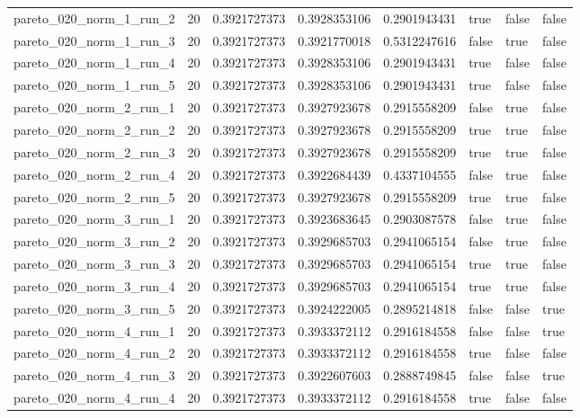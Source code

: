 \begin{tabular}{@{}llllllll@{}}
pareto\_020\_norm\_1\_run\_2 & 20 & 0.3921727373 & 0.3928353106 & 0.2901943431 & true & false & false \\
pareto\_020\_norm\_1\_run\_3 & 20 & 0.3921727373 & 0.3921770018 & 0.5312247616 & false & true & false \\
pareto\_020\_norm\_1\_run\_4 & 20 & 0.3921727373 & 0.3928353106 & 0.2901943431 & true & false & false \\
pareto\_020\_norm\_1\_run\_5 & 20 & 0.3921727373 & 0.3928353106 & 0.2901943431 & true & false & false \\
pareto\_020\_norm\_2\_run\_1 & 20 & 0.3921727373 & 0.3927923678 & 0.2915558209 & false & true & false \\
pareto\_020\_norm\_2\_run\_2 & 20 & 0.3921727373 & 0.3927923678 & 0.2915558209 & true & true & false \\
pareto\_020\_norm\_2\_run\_3 & 20 & 0.3921727373 & 0.3927923678 & 0.2915558209 & true & true & false \\
pareto\_020\_norm\_2\_run\_4 & 20 & 0.3921727373 & 0.3922684439 & 0.4337104555 & false & true & false \\
pareto\_020\_norm\_2\_run\_5 & 20 & 0.3921727373 & 0.3927923678 & 0.2915558209 & true & true & false \\
pareto\_020\_norm\_3\_run\_1 & 20 & 0.3921727373 & 0.3923683645 & 0.2903087578 & false & true & false \\
pareto\_020\_norm\_3\_run\_2 & 20 & 0.3921727373 & 0.3929685703 & 0.2941065154 & false & true & false \\
pareto\_020\_norm\_3\_run\_3 & 20 & 0.3921727373 & 0.3929685703 & 0.2941065154 & true & true & false \\
pareto\_020\_norm\_3\_run\_4 & 20 & 0.3921727373 & 0.3929685703 & 0.2941065154 & true & true & false \\
pareto\_020\_norm\_3\_run\_5 & 20 & 0.3921727373 & 0.3924222005 & 0.2895214818 & false & false & true \\
pareto\_020\_norm\_4\_run\_1 & 20 & 0.3921727373 & 0.3933372112 & 0.2916184558 & false & false & true \\
pareto\_020\_norm\_4\_run\_2 & 20 & 0.3921727373 & 0.3933372112 & 0.2916184558 & true & false & false \\
pareto\_020\_norm\_4\_run\_3 & 20 & 0.3921727373 & 0.3922607603 & 0.2888749845 & false & false & true \\
pareto\_020\_norm\_4\_run\_4 & 20 & 0.3921727373 & 0.3933372112 & 0.2916184558 & true & false & false \\

\end{tabular}
